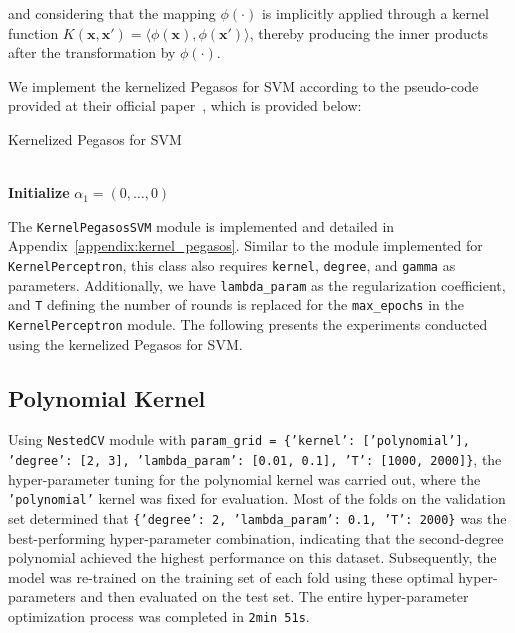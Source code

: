 and considering that the mapping $\phi(\cdot)$ is implicitly applied through a kernel function $K(\mathbf{x}, \mathbf{x'}) = \langle \phi(\mathbf{x}), \phi(\mathbf{x'}) \rangle$, thereby producing the inner products after the transformation by $\phi(\cdot)$.

We implement the kernelized Pegasos for SVM according to the pseudo-code provided at their official paper~\cite{shalev2007pegasos}, which is provided below:

\begin{algorithm}[H]
    \SetAlgoLined
    \DontPrintSemicolon
    \caption{Kernelized Pegasos for SVM} \vspace{5pt}
     \\
    \textbf{Initialize } $\alpha_1 = (0, \dots, 0)$ \\
\end{algorithm}

The \texttt{KernelPegasosSVM} module is implemented and detailed in Appendix~\ref{appendix:kernel_pegasos}. Similar to the module implemented for \texttt{KernelPerceptron}, this class also requires \texttt{kernel}, \texttt{degree}, and \texttt{gamma} as parameters. Additionally, we have \texttt{lambda\_param} as the regularization coefficient, and \texttt{T} defining the number of rounds is replaced for the \texttt{max\_epochs} in the \texttt{KernelPerceptron} module. The following presents the experiments conducted using the kernelized Pegasos for SVM.

\subsection{Polynomial Kernel}

Using \texttt{NestedCV} module with \texttt{param\_grid = \{'kernel': ['polynomial'], 'degree': [2, 3], 'lambda\_param': [0.01, 0.1], 'T': [1000, 2000]\}}, the hyper-parameter tuning for the polynomial kernel was carried out, where the \texttt{'polynomial'} kernel was fixed for evaluation. Most of the folds on the validation set determined that \texttt{\{'degree': 2, 'lambda\_param': 0.1, 'T': 2000\}} was the best-performing hyper-parameter combination, indicating that the second-degree polynomial achieved the highest performance on this dataset. Subsequently, the model was re-trained on the training set of each fold using these optimal hyper-parameters and then evaluated on the test set. The entire hyper-parameter optimization process was completed in \texttt{2min 51s}.


